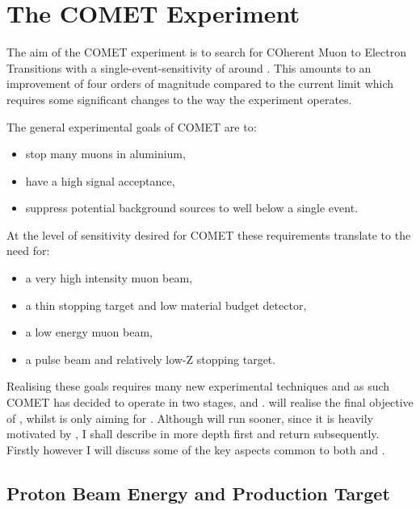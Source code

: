 
\chapter{The COMET Experiment}

The aim of the COMET experiment is to search for COherent Muon to Electron Transitions with a single-event-sensitivity of around \sensePII.
This amounts to an improvement of four orders of magnitude compared to the current limit \cite{sindrum2006} which requires some significant changes to the way the experiment operates.

The general experimental goals of COMET are to:
\begin{itemize}
\item stop many muons in aluminium,
\item have a high signal acceptance,
\item suppress potential background sources to well below a single event.
\end{itemize}

At the level of sensitivity desired for COMET these requirements translate to the need for:
\begin{itemize}
\item a very high intensity muon beam,
\item a thin stopping target and low material budget detector,
\item a low energy muon beam,
\item a pulse beam and relatively low-Z stopping target.
\end{itemize}

Realising these goals requires many new experimental techniques and as such COMET has decided to operate in two stages, \phaseI and \phaseII.
\phaseII will realise the final objective of \sensePII, whilst \phaseI is only aiming for \sensePI. 
Although \phaseI will run sooner, since it is heavily motivated by \phaseII, I shall describe \phaseII in more depth first and return \phaseI subsequently.
Firstly however I will discuss some of the key aspects common to both \phaseI and \phaseII.

\section{Proton Beam Energy and Production Target}

